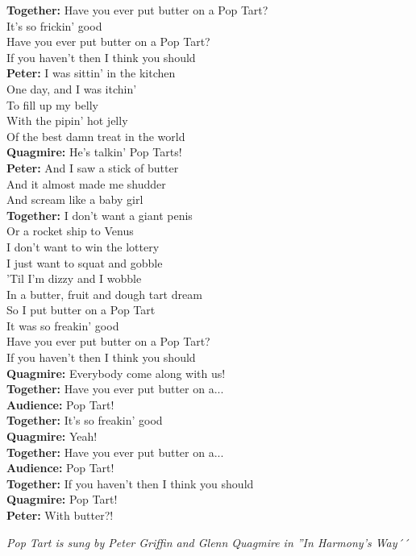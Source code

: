 \vspace{10pt}
\textbf{Together:} Have you ever put butter on a Pop Tart?\\
It's so frickin' good\\
Have you ever put butter on a Pop Tart?\\
If you haven't then I think you should\\
\textbf{Peter:} I was sittin' in the kitchen\\
One day, and I was itchin'\\
To fill up my belly\\
With the pipin' hot jelly\\
Of the best damn treat in the world\\
\textbf{Quagmire:} He's talkin' Pop Tarts!\\
\textbf{Peter:} And I saw a stick of butter\\
And it almost made me shudder\\
And scream like a baby girl\\
\textbf{Together:} I don't want a giant penis\\
Or a rocket ship to Venus\\
I don't want to win the lottery\\
I just want to squat and gobble\\
'Til I'm dizzy and I wobble\\
In a butter, fruit and dough tart dream\\
So I put butter on a Pop Tart\\
It was so freakin' good\\
Have you ever put butter on a Pop Tart?\\
If you haven't then I think you should\\
\textbf{Quagmire:} Everybody come along with us!\\
\textbf{Together:} Have you ever put butter on a...\\
\textbf{Audience:} Pop Tart!\\
\textbf{Together:} It's so freakin' good\\
\textbf{Quagmire:} Yeah!\\
\textbf{Together:} Have you ever put butter on a...\\
\textbf{Audience:} Pop Tart!\\
\textbf{Together:} If you haven't then I think you should\\
\textbf{Quagmire:} Pop Tart!\\
\textbf{Peter:} With butter?!
\par
\vspace{10pt}
{\footnotesize\textit{Pop Tart is sung by Peter Griffin and Glenn Quagmire in ''In Harmony's Way´´}}
